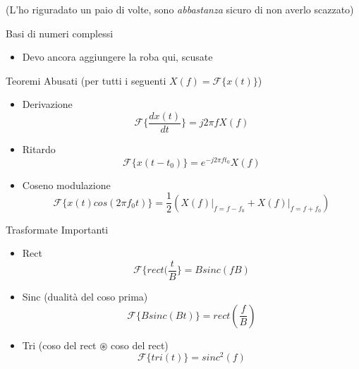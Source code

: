 \documentclass{article}
\begin{document}
(L'ho riguradato un paio di volte, sono \emph{abbastanza} sicuro di non averlo scazzato)

Basi di numeri complessi
\begin{itemize}
\item Devo ancora aggiungere la roba qui, scusate
\end{itemize}

Teoremi Abusati (per tutti i seguenti $X(f) = \mathcal{F}\{x(t)\}$)
\begin{itemize}
  \item Derivazione \begin{equation*}
    \mathcal{F}\{\frac{dx(t)}{dt}\} = j2\pi f X(f)
  \end{equation*}
  
  \item Ritardo \begin{equation*}
    \mathcal{F}\{x(t-t_0)\} = e^{-j2\pi ft_0} X(f)
  \end{equation*}

  \item Coseno modulazione \begin{equation*}
    \mathcal{F}\{x(t) cos(2\pi f_0 t)\} = \frac{1}{2}(X(f)\rvert _{f=f-f_0} + X(f)\rvert _{f=f+f_0})
  \end{equation*}
\end{itemize}

Trasformate Importanti
\begin{itemize}
  \item Rect \begin{equation*}
    \mathcal{F}\{rect(\frac{t}{B}\} = B sinc(fB)
  \end{equation*}
  
  \item Sinc (dualità del coso prima) \begin{equation*}
    \mathcal{F}\{B sinc(Bt)\} = rect(\frac{f}{B})
  \end{equation*}
  
  \item Tri (coso del rect $\circledast$ coso del rect) \begin{equation*}
    \mathcal{F}\{tri(t)\} = sinc^2(f)
  \end{equation*}
\end{itemize}
\end{document}

